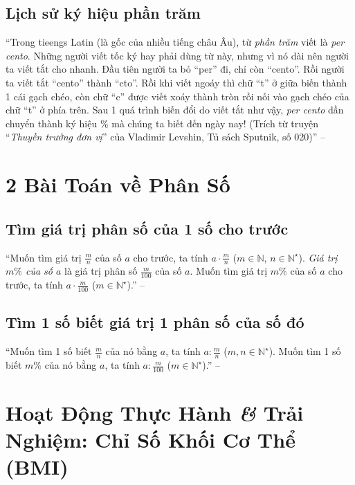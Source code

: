 \documentclass[oneside]{book}
\numberwithin{equation}{section}
\begin{document}
\subsection{Lịch sử ký hiệu phần trăm}
``Trong tieengs Latin (là gốc của nhiều tiếng châu Âu), từ \textit{phần trăm} viết là \textit{per cento}. Những người viết tốc ký hay phải dùng từ này, nhưng vì nó dài nên người ta viết tắt cho nhanh. Đầu tiên người ta bỏ ``per'' đi, chỉ còn ``cento''. Rồi người ta viết tắt ``cento'' thành ``cto''. Rồi khi viết ngoáy thì chữ ``t'' ở giữa biến thành 1 cái gạch chéo, còn chữ ``c'' được viết xoáy thành tròn rồi nối vào gạch chéo của chữ ``t'' ở phía trên. Sau 1 quá trình biến đổi do viết tắt như vậy, \textit{per cento} dần chuyển thành ký hiệu \% mà chúng ta biết đến ngày nay! (Trích từ truyện ``\textit{Thuyền trưởng đơn vị}'' của Vladimir Levshin, Tủ sách Sputnik, số 020)'' -- \cite[p. 66]{Thai_Anh_Dat_Ha_Loan_Nam_Quang_Toan_6_tap_2}

\section{2 Bài Toán về Phân Số}

\subsection{Tìm giá trị phân số của 1 số cho trước}
``Muốn tìm giá trị $\frac{m}{n}$ của số $a$ cho trước, ta tính $a\cdot\frac{m}{n}$ ($m\in\mathbb{N}$, $n\in\mathbb{N}^\star$). \emph{Giá trị $m\%$ của số $a$} là giá trị phân số $\frac{m}{100}$ của số $a$. Muốn tìm giá trị $m\%$ của số $a$ cho trước, ta tính $a\cdot\frac{m}{100}$ ($m\in\mathbb{N}^\star$).'' -- \cite[p. 68]{Thai_Anh_Dat_Ha_Loan_Nam_Quang_Toan_6_tap_2}

\subsection{Tìm 1 số biết giá trị 1 phân số của số đó}
``Muốn tìm 1 số biết $\frac{m}{n}$ của nó bằng $a$, ta tính $a:\frac{m}{n}$ ($m,n\in\mathbb{N}^\star$). Muốn tìm 1 số biết $m\%$ của nó bằng $a$, ta tính $a:\frac{m}{100}$ ($m\in\mathbb{N}^\star$).'' -- \cite[p. 68]{Thai_Anh_Dat_Ha_Loan_Nam_Quang_Toan_6_tap_2}

\section{Hoạt Động Thực Hành \textit{\&} Trải Nghiệm: Chỉ Số Khối Cơ Thể (BMI)}
\end{document}
